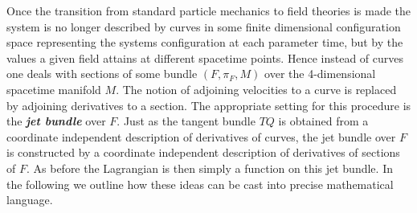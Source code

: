 \documentclass[a4paper,12pt, DIV=14, BCOR=5mm, twoside, headsepline]{scrbook}
\begin{document}
Once the transition from standard particle mechanics to field theories is made the system is no longer described by curves in some finite dimensional configuration space representing the systems configuration at each parameter time, but by the values a given field attains at different spacetime points. Hence instead of curves one deals with sections of some bundle $(F,\pi_F,M)$ over the 4-dimensional spacetime manifold $M$. The notion of adjoining velocities to a curve is replaced by adjoining derivatives to a section. The appropriate setting for this procedure is the \textit{\textbf{jet bundle}} over $F$. Just as the tangent bundle $TQ$ is obtained from a coordinate independent description of derivatives of curves, the jet bundle over $F$ is constructed by a coordinate independent description of derivatives of sections of $F$. As before the Lagrangian is then simply a function on this jet bundle. 
In the following we outline how these ideas can be cast into precise mathematical language. \\
\end{document}
